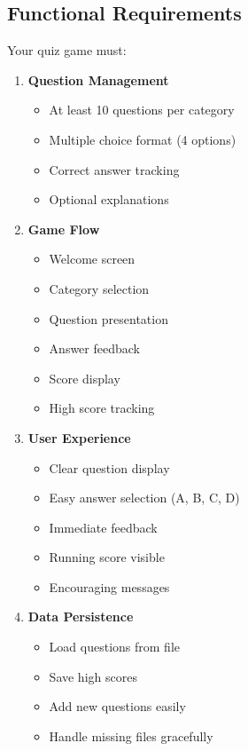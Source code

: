 \documentclass[
  letterpaper,
  DIV=11,
  numbers=noendperiod,
  oneside]{scrreprt}
\providecommand{\tightlist}{%
  \setlength{\itemsep}{0pt}\setlength{\parskip}{0pt}}\usepackage{longtable,booktabs,array}
\begin{document}
\subsection{Functional Requirements}\label{functional-requirements-7}

Your quiz game must:

\begin{enumerate}
\def\labelenumi{\arabic{enumi}.}
\tightlist
\item
  \textbf{Question Management}

  \begin{itemize}
  \tightlist
  \item
    At least 10 questions per category
  \item
    Multiple choice format (4 options)
  \item
    Correct answer tracking
  \item
    Optional explanations
  \end{itemize}
\item
  \textbf{Game Flow}

  \begin{itemize}
  \tightlist
  \item
    Welcome screen
  \item
    Category selection
  \item
    Question presentation
  \item
    Answer feedback
  \item
    Score display
  \item
    High score tracking
  \end{itemize}
\item
  \textbf{User Experience}

  \begin{itemize}
  \tightlist
  \item
    Clear question display
  \item
    Easy answer selection (A, B, C, D)
  \item
    Immediate feedback
  \item
    Running score visible
  \item
    Encouraging messages
  \end{itemize}
\item
  \textbf{Data Persistence}

  \begin{itemize}
  \tightlist
  \item
    Load questions from file
  \item
    Save high scores
  \item
    Add new questions easily
  \item
    Handle missing files gracefully
  \end{itemize}
\end{enumerate}
\end{document}
